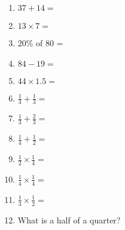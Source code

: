 \documentclass[a4paper]{article}
\begin{document}
\begin{enumerate}
\item \begin{math}  37 + 14 = \end{math} 
\item \begin{math}  13 \times 7 = \end{math} 
\item   20\%  of 80 = 
\item \begin{math}  84 - 19 = \end{math} 
\item \begin{math}  44 \times 1.5 = \end{math} 
\item \begin{math}  \frac{1}{3} + \frac{1}{3} = \end{math} 
\item \begin{math}  \frac{1}{3} + \frac{2}{3} = \end{math} 
\item \begin{math}  \frac{1}{4} + \frac{1}{2} = \end{math} 
\item \begin{math}  \frac{1}{2} \times \frac{1}{4} = \end{math} 
\item \begin{math}  \frac{1}{4} \times \frac{1}{4} = \end{math} 
\item \begin{math}  \frac{1}{3} \times \frac{1}{2} = \end{math} 
\item What is a half of a quarter? 

\end{enumerate}
\end{document}
